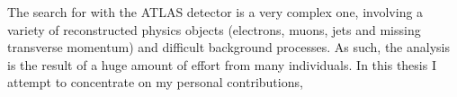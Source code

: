 
The search for \HWWlvlv with the ATLAS detector is a very complex one, involving a variety 
of reconstructed physics objects (electrons, muons, jets and missing transverse momentum)
and difficult background processes. As such, the analysis is the result of a huge amount of
effort from many individuals. In this thesis I attempt to concentrate on my personal 
contributions,

